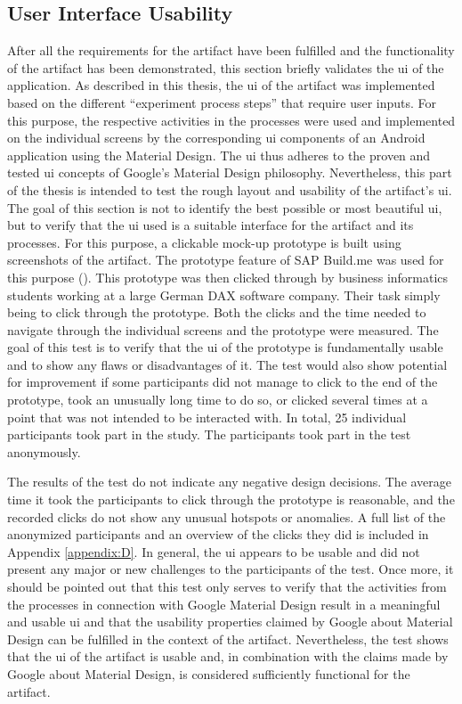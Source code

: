 \subsection{User Interface Usability}

After all the requirements for the artifact have been fulfilled and the functionality of the artifact has been demonstrated, this section briefly validates the \ac{ui} of the application. As described in this thesis, the \ac{ui} of the artifact was implemented based on the different \enquote{experiment process steps} that require user inputs. For this purpose, the respective activities in the processes were used and implemented on the individual screens by the corresponding \ac{ui} components of an Android application using the Material Design. The \ac{ui} thus adheres to the proven and tested \ac{ui} concepts of Google's Material Design philosophy. Nevertheless, this part of the thesis is intended to test the rough layout and usability of the artifact's \ac{ui}. The goal of this section is not to identify the best possible or most beautiful \ac{ui}, but to verify that the \ac{ui} used is a suitable interface for the artifact and its processes. For this purpose, a clickable mock-up prototype is built using screenshots of the artifact. The prototype feature of SAP Build.me was used for this purpose (\cite{SAP.2023}). This prototype was then clicked through by business informatics students working at a large German DAX software company. Their task simply being to click through the prototype. Both the clicks and the time needed to navigate through the individual screens and the prototype were measured. The goal of this test is to verify that the \ac{ui} of the prototype is fundamentally usable and to show any flaws or disadvantages of it. The test would also show potential for improvement if some participants did not manage to click to the end of the prototype, took an unusually long time to do so, or clicked several times at a point that was not intended to be interacted with. In total, 25 individual participants took part in the study. The participants took part in the test anonymously. 

The results of the test do not indicate any negative design decisions. The average time it took the participants to click through the prototype is reasonable, and the recorded clicks do not show any unusual hotspots or anomalies. A full list of the anonymized participants and an overview of the clicks they did is included in Appendix \ref{appendix:D}. In general, the \ac{ui} appears to be usable and did not present any major or new challenges to the participants of the test. Once more, it should be pointed out that this test only serves to verify that the activities from the processes in connection with Google Material Design result in a meaningful and usable \ac{ui} and that the usability properties claimed by Google about Material Design can be fulfilled in the context of the artifact. Nevertheless, the test shows that the \ac{ui} of the artifact is usable and, in combination with the claims made by Google about Material Design, is considered sufficiently functional for the artifact.
